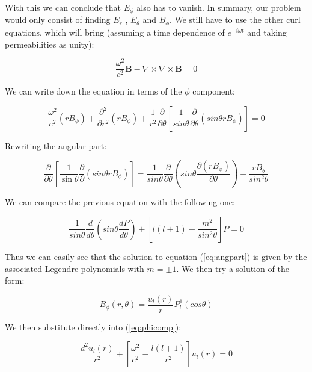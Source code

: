 \documentclass[a4paper,12pt]{article}
\newcommand{\vect}[1]{\boldsymbol{#1}}
\begin{document}
With this we can conclude that $E_{\phi}$ also has to vanish. In summary, our problem would only consist of finding $E_r$ , $E_{\theta}$ and $B_{\phi}$. We still have to use the other curl equations, which will bring (assuming a time dependence of $e^{-i \omega t}$ and taking permeabilities as unity): 

\begin{equation}
\frac{\omega ^2}{c^2}\vect{B} - \nabla \times \nabla \times \vect{B}  = 0
\label{eq:curl}
\end{equation}

We can write down the equation in terms of the $\phi$ component: 

\begin{equation}
\frac{\omega ^2}{c^2}(r B_{\phi}) + \frac{\partial ^2 }{\partial r^2}(rB_{\phi}) + \frac{1}{r^2}\frac{\partial}{\partial \theta} \left[\frac{1}{sin \theta} \frac{\partial}{\partial \theta} (sin \theta rB_{\phi}) \right] = 0 
\label{eq:phicomp}
\end{equation}

Rewriting the angular part: 

\begin{equation}
\frac{\partial}{\partial \theta} \left[ \frac{1}{\sin \theta} \frac{\partial}{\partial} (sin \theta rB_{\phi}) \right] = \frac{1}{sin \theta} \frac{\partial}{\partial \theta} \left(sin \theta \frac{\partial (rB_{\phi})}{\partial \theta} \right) - \frac{r B_{\theta}}{sin^2 \theta}
\label{eq:angpart}
\end{equation}

We can compare the previous equation with the following one: 

\begin{equation}
\frac{1}{sin \theta} \frac{d}{d \theta} \left(sin \theta \frac{dP}{d \theta} \right) + \left[l(l+1) - \frac{m^2}{sin^2 \theta} \right]P = 0
\label{eq:comp}
\end{equation}

Thus we can easily see that the solution to equation (\ref{eq:angpart}) is given by the associated Legendre polynomials with $m = \pm 1$. We then try a solution of the form: 

\begin{equation}
B_{\phi} (r , \theta) = \frac{u_{l}(r)}{r} P^1_{l}(cos \theta)
\label{eq:sol}
\end{equation}

We then substitute directly into (\ref{eq:phicomp}): 

\begin{equation}
\frac{d^2 u_{l}(r)}{r^2} + \left[\frac{\omega^2}{c^2} - \frac{l(l+1)}{r^2} \right] u_l(r) = 0
\label{eq:freqsol}
\end{equation}
\end{document}
